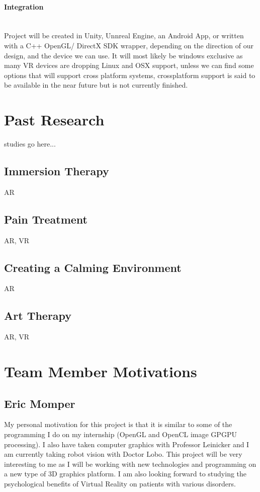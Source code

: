 \documentclass[a4paper,10pt]{article}
\begin{document}
\paragraph{Integration} ~\\ Project will be created in Unity, Unnreal Engine, an Android App, or written with a C++ OpenGL/ DirectX SDK wrapper, depending on the direction of our design, and 
the device we can use. It will most likely be windows exclusive as many VR devices are dropping Linux and OSX support, unless we can find some options that will 
support cross platform systems, crossplatform support is said to be available in the near future but is not currently finished.  

\pagebreak

\section{Past Research}
studies go here...
\subsection{Immersion Therapy}
AR
\subsection{Pain Treatment}
AR, VR
\subsection{Creating a Calming Environment}
AR
\subsection{Art Therapy}
AR, VR
\pagebreak

\section{Team Member Motivations}
\subsection{Eric Momper}
My personal motivation for this project is that it is similar to some of the programming I do on my internship (OpenGL and OpenCL image GPGPU processing).
I also have taken computer graphics with Professor Leinicker and I am currently taking robot vision with Doctor Lobo. This project will be very interesting to me as  
I will be working with new technologies and programming on a new type of 3D graphics platform. I am also looking forward to studying the psychological benefits
of Virtual Reality on patients with various disorders.  
\end{document}
